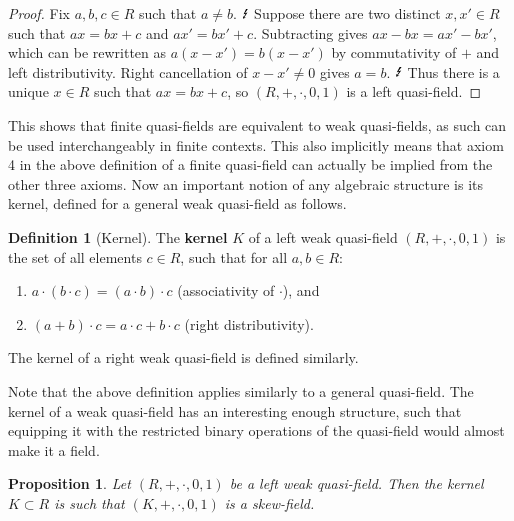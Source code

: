 \documentclass{report}
\newtheorem{proposition}[theorem]{Proposition}
\theoremstyle{definition}\newtheorem*{definition}{Definition}
\theoremstyle{definition}\newtheorem*{example}{Example}
\theoremstyle{remark}\newtheorem*{remark}{Remark}
\begin{document}
\begin{proof}
Fix $ a, b, c \in R $ such that $ a \ne b $. $ \text{\Lightning} $ Suppose there are two distinct $ x, x' \in R $ such that $ ax = bx + c $ and $ ax' = bx' + c $. Subtracting gives $ ax - bx = ax' - bx' $, which can be rewritten as $ a (x - x') = b (x - x') $ by commutativity of $ + $ and left distributivity. Right cancellation of $ x - x' \ne 0 $ gives $ a = b $. $ \text{\Lightning} $ Thus there is a unique $ x \in R $ such that $ ax = bx + c $, so $ (R, +, \cdot, 0, 1) $ is a left quasi-field.
\end{proof}

This shows that finite quasi-fields are equivalent to weak quasi-fields, as such can be used interchangeably in finite contexts. This also implicitly means that axiom 4 in the above definition of a finite quasi-field can actually be implied from the other three axioms. Now an important notion of any algebraic structure is its kernel, defined for a general weak quasi-field as follows.

\begin{definition}[Kernel]
The \textbf{kernel} $ K $ of a left weak quasi-field $ (R, +, \cdot, 0, 1) $ is the set of all elements $ c \in R $, such that for all $ a, b \in R $:
\begin{enumerate}
  \item $ a \cdot (b \cdot c) = (a \cdot b) \cdot c $ (associativity of $ \cdot $), and
  \item $ (a + b) \cdot c = a \cdot c + b \cdot c $ (right distributivity).
\end{enumerate}
The kernel of a right weak quasi-field is defined similarly.
\end{definition}

Note that the above definition applies similarly to a general quasi-field. The kernel of a weak quasi-field has an interesting enough structure, such that equipping it with the restricted binary operations of the quasi-field would almost make it a field.

\begin{proposition}
Let $ (R, +, \cdot, 0, 1) $ be a left weak quasi-field. Then the kernel $ K \subset R $ is such that $ (K, +, \cdot, 0, 1) $ is a skew-field.
\end{proposition}
\end{document}
